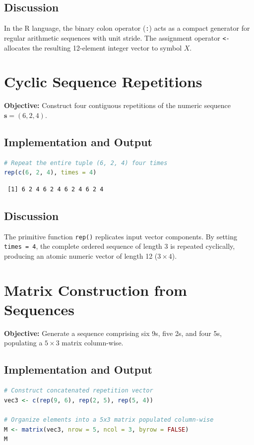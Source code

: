 \documentclass[11pt, a4paper]{article}
\begin{document}
\subsection{Discussion}
In the R language, the binary colon operator (\texttt{:}) acts as a compact generator for regular arithmetic sequences with unit stride. The assignment operator \texttt{<-} allocates the resulting 12-element integer vector to symbol $X$.

\section{Cyclic Sequence Repetitions}
\textbf{Objective:} Construct four contiguous repetitions of the numeric sequence $\mathbf{s} = (6, 2, 4)$.

\subsection{Implementation and Output}
\begin{lstlisting}[language=R]
# Repeat the entire tuple (6, 2, 4) four times
rep(c(6, 2, 4), times = 4)
\end{lstlisting}

\begin{lstlisting}
 [1] 6 2 4 6 2 4 6 2 4 6 2 4
\end{lstlisting}

\subsection{Discussion}
The primitive function \texttt{rep()} replicates input vector components. By setting \texttt{times = 4}, the complete ordered sequence of length 3 is repeated cyclically, producing an atomic numeric vector of length 12 ($3 \times 4$).

\section{Matrix Construction from Sequences}
\textbf{Objective:} Generate a sequence comprising six 9s, five 2s, and four 5s, populating a $5 \times 3$ matrix column-wise.

\subsection{Implementation and Output}
\begin{lstlisting}[language=R]
# Construct concatenated repetition vector
vec3 <- c(rep(9, 6), rep(2, 5), rep(5, 4))

# Organize elements into a 5x3 matrix populated column-wise
M <- matrix(vec3, nrow = 5, ncol = 3, byrow = FALSE)
M
\end{lstlisting}
\end{document}
